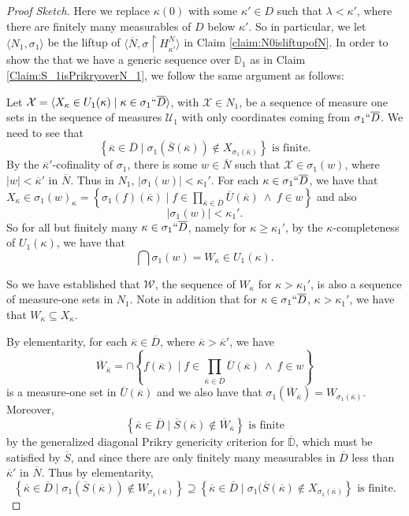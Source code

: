 \documentclass{amsart}
\theoremstyle{definition}
\theoremstyle{remark}
\newcommand{\D}{\mathbb{D}}
\newcommand{\N}{{\overline{N}}}
\renewcommand{\S}{{\overline{S}}}
\newcommand{\U}{\mathcal{U}}
\newcommand{\st}{\; | \;}
\newcommand{\set}[2]{\left\{#1\st #2 \right\}}
\newcommand{\seq}[2]{\langle #1 \st #2 \rangle}
\newcommand{\rest}{\mathbin{\upharpoonright}}
\begin{document}
\begin{proof}[Proof Sketch]
Here we replace $\kappa(0)$ with some $\kappa' \in D$ such that $\lambda < \kappa' $, where there are finitely many measurables of $D$ below $\kappa'$. 
So in particular, we let $\langle N_1, \sigma_1 \rangle$ be the liftup of $\langle \N, \sigma \rest H_{\overline{\kappa'}}^\N\rangle$ in Claim \ref{claim:N0isliftupofN}. In order to show the that we have a generic sequence over $\D_1$ as in Claim \ref{Claim:S_1isPrikryoverN_1}, we follow the same argument as follows:

Let $\mathcal X = \seq{ X_\kappa \in U_1(\kappa) }{ \kappa \in \sigma_1``\overline D }$, with $\mathcal X \in N_1$, be a sequence of measure one sets in the sequence of measures $\U_1$ with only coordinates coming from $\sigma_1``\overline D$.
We need to see that 
$$\set{ \overline \kappa \in \overline D}{\sigma_1(\S(\overline \kappa)) \notin X_{\sigma_1(\overline \kappa)} }  \text{ is finite.}$$
By the $\overline{\kappa}'$-cofinality of $\sigma_1$, there is some $w \in \N$ such that $\mathcal X \in \sigma_1(w)$, where $|w| < \overline{\kappa}'$ in $\N$. Thus in $N_1$, $|\sigma_1(w)| < \kappa_1'$. For each $\kappa \in \sigma_1``\overline D$, we have that $X_\kappa \in \sigma_1(w)_\kappa = \set{\sigma_1(f)(\overline \kappa) }{ f \in \prod_{\overline \kappa \in \overline D} \overline U(\overline \kappa) \ \land \ f \in w }$ and also $$|\sigma_1(w)|<\kappa_1'.$$ So for all but finitely many $\kappa \in \sigma_1``\overline D$, namely for $\kappa \geq \kappa_1'$, by the $\kappa$-completeness of $U_1(\kappa)$, we have that $$\bigcap \sigma_1(w)=W_\kappa \in U_1(\kappa).$$

So we have established that $\mathcal W$, the sequence of $W_\kappa$ for $\kappa>\kappa_1'$, is also a sequence of measure-one sets in $N_1$. Note in addition that for $\kappa \in \sigma_1``\overline D$, $\kappa> \kappa_1'$, we have that $W_\kappa \subseteq X_\kappa$. 

By elementarity, for each $\overline \kappa \in \overline D$, where $\overline \kappa > \overline \kappa'$, we have $$\overline W_{\overline \kappa} =\cap \set{f(\overline \kappa) }{ f \in \textstyle\prod_{\overline \kappa \in \overline D} \overline U(\overline \kappa) \ \land \ f \in w }$$ is a measure-one set in $\overline U(\overline \kappa)$ and we also have that $\sigma_1(\overline W_{\overline \kappa}) = W_{\sigma_1(\overline \kappa)}$. Moreover, 
	$$\set{\overline \kappa \in \overline D}{\overline S(\overline \kappa) \notin \overline W_{\overline \kappa}} \text{ is finite}$$ by the generalized diagonal Prikry genericity criterion for $\overline{\D}$, which must be satisfied by $\overline S$, and since there are only finitely many measurables in $\overline D$ less than $\overline \kappa'$ in $\N$.
Thus by elementarity,
	$$\set{ \overline \kappa \in \overline D }{ \sigma_1(\overline S(\overline \kappa)) \notin W_{\sigma_1(\overline \kappa)} } \supseteq \set{ \overline \kappa \in \overline D }{ \sigma_1(\overline S(\overline \kappa) \notin X_{\sigma_1(\overline \kappa)}} \text{ is finite.}$$


\end{proof}
\end{document}
